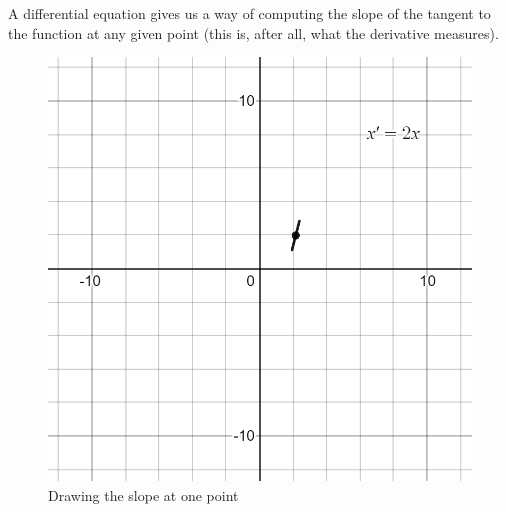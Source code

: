 A differential equation gives us a way of computing the slope of the tangent to the function at any given point (this is, after all, what the derivative measures). 
\begin{figure}[h]
    \centering
    \includegraphics[scale=0.25]{Images/slope_field_1.png}
    \caption{Drawing the slope at one point}
    \label{fig:slope_one_pt}
\end{figure}

